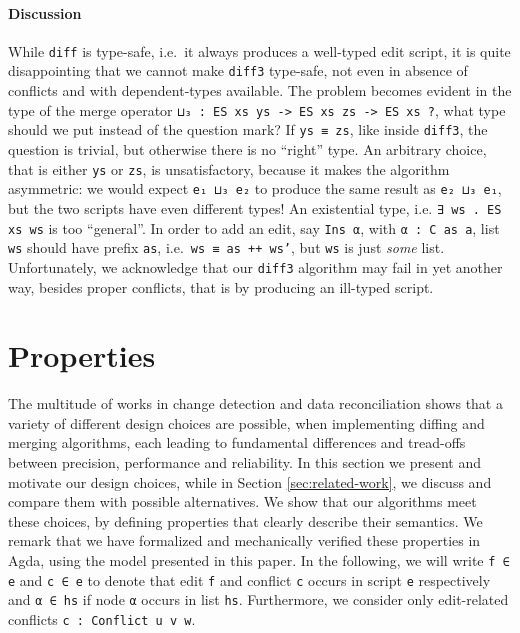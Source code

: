 \documentclass{sigplanconf}
\theoremstyle{plain}
\begin{document}
\paragraph{Discussion}
While \texttt{diff} is type-safe, i.e.\ it always produces a
well-typed edit script, it is quite disappointing that we cannot make
\texttt{diff3} type-safe, not even in absence of conflicts and with
dependent-types available.
%
The problem becomes evident in the type of the merge operator
\texttt{⊔₃ : ES xs ys -> ES xs zs -> ES xs ?}, what type should we put
instead of the question mark?
%
If \texttt{ys ≡ zs}, like inside \texttt{diff3}, the question is
trivial, but otherwise there is no ``right'' type.
%
An arbitrary choice, that is either \texttt{ys} or \texttt{zs}, is
unsatisfactory, because it makes the algorithm asymmetric: we would
expect \texttt{e₁ ⊔₃ e₂} to produce the same result as \texttt{e₂ ⊔₃
  e₁}, but the two scripts have even different types!
%
An existential type, i.e. \texttt{∃ ws . ES xs ws} is too ``general''.
In order to add an edit, say \texttt{Ins α}, with \texttt{α : C as a},
list \texttt{ws} should have prefix \texttt{as}, i.e.\ \texttt{ws ≡ as
  ++ ws'}, but \texttt{ws} is just \emph{some} list.
%
Unfortunately, we acknowledge that our \texttt{diff3} algorithm may
fail in yet another way, besides proper conflicts, that is by
producing an ill-typed script.

\section{Properties}
\label{sec:properties}
%
The multitude of works in change detection and data reconciliation
\cite{Pierce98, Ramsey01, UnisonSpec, PetersSurvey, Pierce07, Mens02,
  Chawathe96} shows that a variety of different design choices are
possible, when implementing diffing and merging algorithms, each
leading to fundamental differences and tread-offs between precision,
performance and reliability.
%
In this section we present and motivate our design choices, while in
Section \ref{sec:related-work}, we discuss and compare them with
possible alternatives.
%
We show that our algorithms meet these choices, by defining properties
that clearly describe their semantics.
%
We remark that we have formalized and mechanically verified these
properties in Agda, using the model presented in this paper.
%
In the following, we will write \texttt{f ∈ e} and \texttt{c ∈ e} to
denote that edit \texttt{f} and conflict \texttt{c} occurs in script
\texttt{e} respectively and \texttt{α ∈ hs} if node \texttt{α}
occurs in list \texttt{hs}.
%
Furthermore, we consider only edit-related conflicts \texttt{c :
  Conflict u v w}.
  
\end{document}
